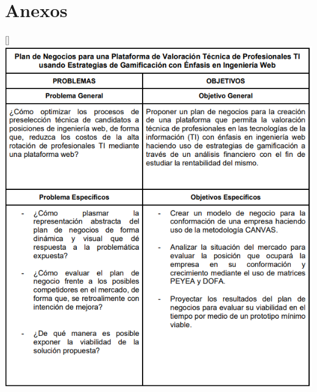 \section*{Anexos}
\noindent 

\vspace{2mm}
        \begin{minipage}{0.9\textwidth}
        \centering
        [{}]{ }
        \label{matrizgeneral}
         \includegraphics[width=1\textwidth]{Images/matriz general.png}
\end{minipage}

